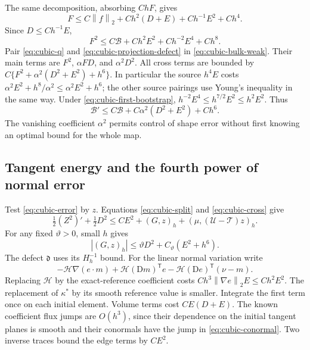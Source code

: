 \documentclass[11pt,a4paper]{article}
\numberwithin{equation}{section}
\theoremstyle{remark}
\newcommand{\norm}[1]{\left\lVert #1\right\rVert}
\begin{document}
The same decomposition, absorbing \(ChF\), gives
\[
 F\leq C\norm f_2+Ch^2(D+E)+Ch^{-1}E^2+Ch^4.
\]
Since \(D\leq Ch^{-1}E\),
\begin{equation}\label{eq:cubic-shape-normal}
 F^2\leq C\mathcal B+Ch^2E^2+Ch^{-2}E^4+Ch^8.
\end{equation}
Pair \eqref{eq:cubic-q} and \eqref{eq:cubic-projection-defect} in
\eqref{eq:cubic-bulk-weak}. Their main terms are \(F^2\),
\(\alpha FD\), and \(\alpha^2D^2\). All cross terms are bounded by
\(C\{F^2+\alpha^2(D^2+E^2)+h^6\}\). In particular the source
\(h^4E\) costs
\(\alpha^2E^2+h^8/\alpha^2\leq\alpha^2E^2+h^6\);
the other source pairings use Young's inequality in the same way.
Under \eqref{eq:cubic-first-bootstrap},
\(h^{-2}E^4\leq h^{7/2}E^2\leq h^2E^2\). Thus
\begin{equation}\label{eq:cubic-bulk-energy}
 \mathcal B'\leq C\mathcal B+C\alpha^2(D^2+E^2)+Ch^6.
\end{equation}
The vanishing coefficient \(\alpha^2\) permits control of shape error
without first knowing an optimal bound for the whole map.

\subsection{Tangent energy and the fourth power of normal error}

Test \eqref{eq:cubic-error} by \(z\). Equations
\eqref{eq:cubic-split} and \eqref{eq:cubic-cross} give
\begin{equation}\label{eq:cubic-tangent-start}
 \tfrac12(Z^2)'+\tfrac12D^2
       \leq CE^2+(G,z)_h+(\mu,(\mathcal U-\mathcal T)z)_h.
\end{equation}
For any fixed \(\vartheta>0\), small \(h\) gives
\begin{equation}\label{eq:cubic-G}
             |(G,z)_h|\leq\vartheta D^2+C_\vartheta(E^2+h^6).
\end{equation}
The defect \(\mathfrak d\) uses its \(H_h^{-1}\) bound. For the linear
normal variation write
\[
 -\mathcal H\nabla(e\cdot m)+\mathcal H(\mathrm Dm)^{\mathsf T}e
       -\mathcal H(\mathrm De)^{\mathsf T}(\nu-m).
\]
Replacing \(\mathcal H\) by the exact-reference coefficient costs
\(Ch^3\norm{\nabla e}_2E\leq Ch^2E^2\). The replacement of
\(\kappa^*\) by its smooth reference value is smaller. Integrate the
first term once on each initial element. Volume terms cost
\(CE(D+E)\). The known coefficient flux jumps are \(O(h^3)\), since
their dependence on the initial tangent planes is smooth and their
conormals have the jump in \eqref{eq:cubic-conormal}. Two inverse
traces bound the edge terms by \(CE^2\).
\end{document}
